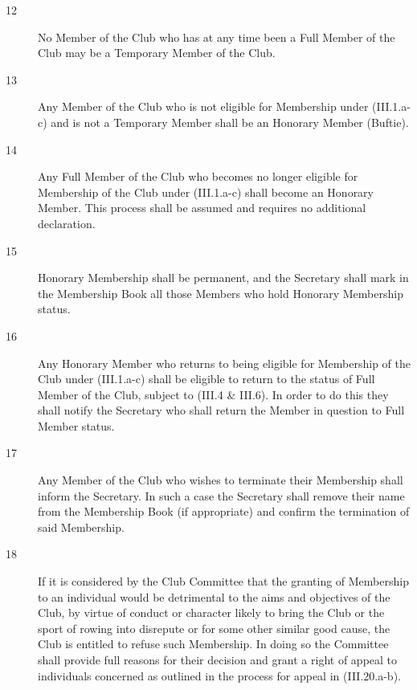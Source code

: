 \documentclass{article}
\begin{document}
\begin{description}
\begin{description}
	\item[12] No Member of the Club who has at any time been a Full Member of the Club
	may be a Temporary Member of the Club.\\
	
	\item[13]Any Member of the Club who is not eligible for Membership under (III.1.a-c)
	and is not a Temporary Member shall be an Honorary Member (Buftie).\\
	
	\item[14] Any Full Member of the Club who becomes no longer eligible for
	Membership of the Club under (III.1.a-c) shall become an Honorary Member.
	This process shall be assumed and requires no additional declaration.\\
	
	\item[15] Honorary Membership shall be permanent, and the Secretary shall mark in the
	Membership Book all those Members who hold Honorary Membership status.\\
	
	\item[16] Any Honorary Member who returns to being eligible for Membership of the
	Club under (III.1.a-c) shall be eligible to return to the status of Full Member of
	the Club, subject to (III.4 \& III.6). In order to do this they shall notify the
	Secretary who shall return the Member in question to Full Member status.\\
	
	\item[17] Any Member of the Club who wishes to terminate their Membership shall
	inform the Secretary. In such a case the Secretary shall remove their name
	from the Membership Book (if appropriate) and confirm the termination of
	said Membership.\\
	
	\item[18] If it is considered by the Club Committee that the granting of Membership to
	an individual would be detrimental to the aims and objectives of the Club, by
	virtue of conduct or character likely to bring the Club or the sport of rowing
	into disrepute or for some other similar good cause, the Club is entitled to
	refuse such Membership. In doing so the Committee shall provide full reasons
	for their decision and grant a right of appeal to individuals concerned as
	outlined in the process for appeal in (III.20.a-b).\\
	

\end{description}
\end{description}
\end{document}
